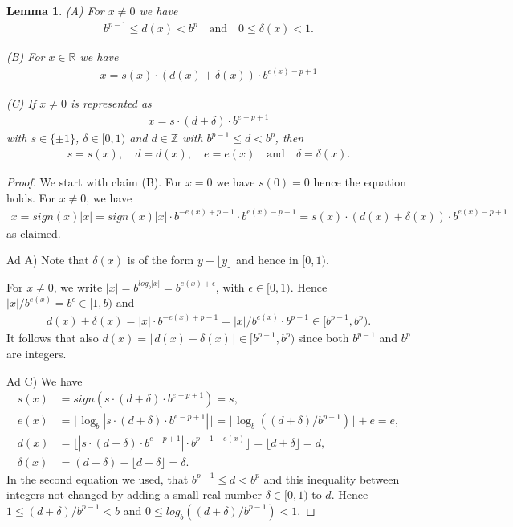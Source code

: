 \documentclass{article}
\theoremstyle{plain}
\newtheorem{lemma}[definition]{Lemma}
\theoremstyle{remark}
\newcommand{\IR}{\mathbb{R}}
\newcommand{\IZ}{\mathbb{Z}}
\newcommand{\qtext}[1]{\quad\text{#1}\quad} %
\newcommand{\floor}[1]{\lfloor#1\rfloor}
\newcommand{\abs}[1]{|#1|}
\newcommand{\eps}{\epsilon}
\begin{document}
\begin{lemma} \label{floatlem}
  (A) For $x \neq 0$ we have
  \begin{align*}
    b^{p-1} \leq d(x) < b^p \qtext{and} 0 \leq \delta(x) < 1.
  \end{align*}

  (B) For $x \in \IR$ we have
  \begin{align*}
    x = s(x) \cdot (d(x) + \delta(x)) \cdot b^{e(x) - p + 1}
  \end{align*}

  (C) If $x \neq 0$ is represented as
  \begin{align*}
    x = s \cdot (d + \delta) \cdot b^{e - p + 1}
  \end{align*}
  with $s \in \{\pm 1\}$, $\delta \in [0,1)$ and $d \in \IZ$ with $b^{p-1} \leq d < b^p$, then
  \begin{align*}
    s = s(x), \quad d = d(x), \quad e = e(x) \qtext{and} \delta = \delta(x).
  \end{align*}
\end{lemma}

\begin{proof}
  We start with claim (B). For $x=0$ we have $s(0) = 0$ hence the equation holds.
  For $x \neq 0$, we have
  \begin{align*}
    x = sign(x) |x| = sign(x) \abs{x} \cdot b^{-e(x)+p-1} \cdot b^{e(x)-p+1} = s(x) \cdot (d(x) + \delta(x)) \cdot b^{e(x)-p+1}
  \end{align*}
  as claimed.

  Ad A) Note that $\delta(x)$ is of the form $y - \floor{y}$ and hence in $[0,1)$.

  For $x \neq 0$, we write $|x| = b^{log_b|x|} = b^{e(x) + \eps}$, with $\eps \in [0,1)$.
  Hence $\abs{x} / b^{e(x)} = b^\eps \in [1,b)$ and
  \begin{align*}
     d(x) + \delta(x) = \abs{x} \cdot b^{-e(x)+p-1} = \abs{x} / b^{e(x)} \cdot b^{p-1} \in [b^{p-1},b^p).
  \end{align*}
  It follows that also $d(x) = \floor{d(x) + \delta(x)} \in [ b^{p-1}, b^p )$
  since both $b^{p-1}$ and $b^p$ are integers.

  Ad C) We have
  \begin{align*}
    s(x) &= sign(s \cdot (d + \delta) \cdot b^{e-p+1}) = s, \\
    e(x) &= \floor{ \log_b \abs{s \cdot (d + \delta) \cdot b^{e-p+1}} } = \floor{\log_b((d+\delta)/b^{p-1})} + e = e, \\
    d(x) &= \floor{\abs{ s \cdot (d + \delta) \cdot b^{e-p+1} } \cdot b^{p-1-e(x)}} = \floor{d + \delta} = d, \\
    \delta(x) &= (d + \delta) - \floor{d + \delta} = \delta.
  \end{align*}
  In the second equation we used, that $b^{p-1} \leq d < b^p$ and this inequality between integers
  not changed by adding a small real number $\delta \in [0,1)$ to $d$.
  Hence $1 \leq (d+\delta) /  b^{p-1} < b$ and $0 \leq log_b((d+\delta) /  b^{p-1}) < 1$.
\end{proof}
\end{document}
